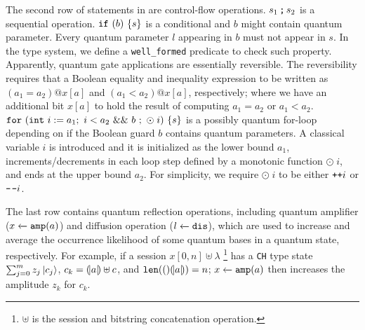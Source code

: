 The second row of statements in  are control-flow operations.
${s_1}\,\texttt{;}\,{s_2}$ is a sequential operation.
$\texttt{if}~{(b)}~{\{s\}}$ is a conditional and $b$ might contain quantum parameter.
Every quantum parameter $l$ appearing in $b$ must not appear in $s$.
In the \qafny type system, we define a \texttt{well\_formed} predicate to check such property.
Apparently, quantum gate applications are essentially reversible. The reversibility requires that a Boolean equality and inequality expression to be written as $(a_1 = a_2) @ x[a]$ and $(a_1 < a_2) @ x[a]$, respectively; where we have an additional bit $x[a]$ to hold the result of computing $a_1=a_2$ or $a_1<a_2$.
$\texttt{for}~{(\texttt{int}~{i}:={a_1};~i<a_2~\&\&~b~;~\odot \;i)}~{\{s\}}$ is a possibly quantum for-loop depending on if the Boolean guard $b$ contains quantum parameters.
A classical variable $i$ is introduced and it is initialized as the lower bound $a_1$, increments/decrements in each loop step defined by 
a monotonic function $\odot \;i$, and ends at the upper bound $a_2$.
For simplicity, we require $\odot \;i$ to be either $\texttt{++}i$ or $\texttt{-\hspace{0.1em}-}i$.

The last row contains quantum reflection operations, including quantum amplifier (${x} \xleftarrow{} {\texttt{amp}(a)}$) and diffusion operation (${l} \xleftarrow{} {\texttt{dis}}$), which are used to increase and average the occurrence likelihood of some quantum bases in a quantum state, respectively. For example, if a session $x[0,n]\uplus \lambda$ \footnote{$\uplus$ is the session and bitstring concatenation operation.} has a \texttt{CH} type state $\sum_{j=0}^{m}{z_j\left\vert{c_j}\right\rangle}$, $c_k=(\!| a |\!)\uplus c$, and $\texttt{len}(()(\!| a |\!))=n$; ${x} \xleftarrow{} {\texttt{amp}(a)}$ then increases the amplitude $z_k$ for $c_k$.

